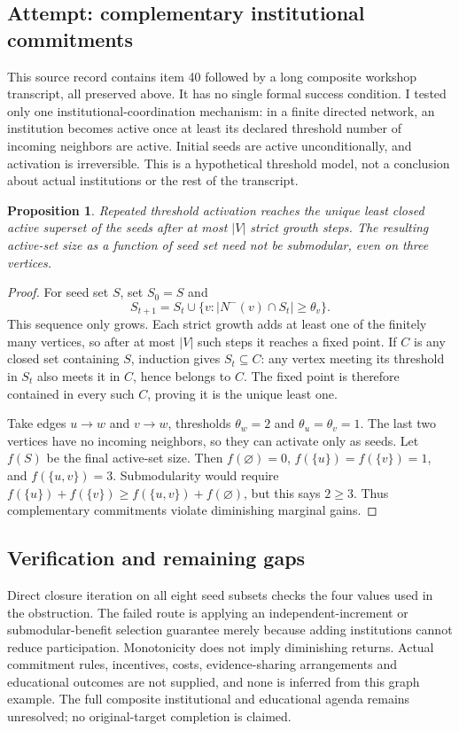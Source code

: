 \documentclass[11pt]{article}
\newtheorem{proposition}{Proposition}
\begin{document}
\subsection{Attempt: complementary institutional commitments}
This source record contains item 40 followed by a long composite workshop transcript, all preserved above. It has no single formal success condition. I tested only one institutional-coordination mechanism: in a finite directed network, an institution becomes active once at least its declared threshold number of incoming neighbors are active. Initial seeds are active unconditionally, and activation is irreversible. This is a hypothetical threshold model, not a conclusion about actual institutions or the rest of the transcript.
\begin{proposition}
Repeated threshold activation reaches the unique least closed active superset of the seeds after at most $|V|$ strict growth steps. The resulting active-set size as a function of seed set need not be submodular, even on three vertices.
\end{proposition}
\begin{proof}
For seed set $S$, set $S_0=S$ and
\[
S_{t+1}=S_t\cup\{v:|N^-(v)\cap S_t|\ge\theta_v\}.
\]
This sequence only grows. Each strict growth adds at least one of the finitely many vertices, so after at most $|V|$ such steps it reaches a fixed point. If $C$ is any closed set containing $S$, induction gives $S_t\subseteq C$: any vertex meeting its threshold in $S_t$ also meets it in $C$, hence belongs to $C$. The fixed point is therefore contained in every such $C$, proving it is the unique least one.

Take edges $u\to w$ and $v\to w$, thresholds $\theta_w=2$ and $\theta_u=\theta_v=1$. The last two vertices have no incoming neighbors, so they can activate only as seeds. Let $f(S)$ be the final active-set size. Then $f(\varnothing)=0$, $f(\{u\})=f(\{v\})=1$, and $f(\{u,v\})=3$. Submodularity would require $f(\{u\})+f(\{v\})\ge f(\{u,v\})+f(\varnothing)$, but this says $2\ge3$. Thus complementary commitments violate diminishing marginal gains.
\end{proof}
\subsection{Verification and remaining gaps}
Direct closure iteration on all eight seed subsets checks the four values used in the obstruction. The failed route is applying an independent-increment or submodular-benefit selection guarantee merely because adding institutions cannot reduce participation. Monotonicity does not imply diminishing returns. Actual commitment rules, incentives, costs, evidence-sharing arrangements and educational outcomes are not supplied, and none is inferred from this graph example. The full composite institutional and educational agenda remains unresolved; no original-target completion is claimed.
\end{document}
